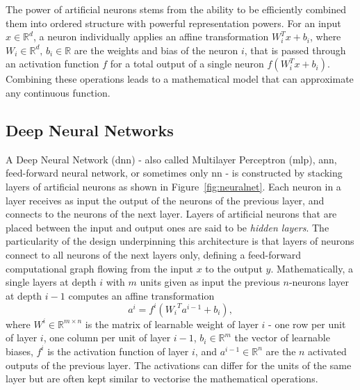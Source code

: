 The power of artificial neurons stems from the ability to be efficiently combined them into ordered structure with powerful representation powers. For an input $x \in \mathbb{R}^d$, a neuron individually applies an affine transformation $W_i^T x + b_i$, where $W_i \in \mathbb{R}^d,\,b_i \in \mathbb{R}$ are the weights and bias of the neuron $i$, that is passed through an activation function $f$ for a total output of a single neuron $f(W_i^T x + b_i)$. Combining these operations leads to a mathematical model that can approximate any continuous function. 

\subsection{Deep Neural Networks}
A Deep Neural Network (\gls{dnn}) - also called Multilayer Perceptron (\gls{mlp}), \gls{ann}, feed-forward neural network, or sometimes only \gls{nn} - is constructed by stacking layers of artificial neurons as shown in Figure~\ref{fig:neuralnet}. Each neuron in a layer receives as input the output of the neurons of the previous layer, and connects to the neurons of the next layer. Layers of artificial neurons that are placed between the input and output ones are said to be \textit{hidden layers}. The particularity of the design underpinning this architecture is that layers of neurons connect to all neurons of the next layers only, defining a feed-forward computational graph flowing from the input $x$ to the output $y$. Mathematically, a single layers at depth $i$ with $m$ units given as input the previous $n$-neurons layer at depth $i-1$ computes an affine transformation
\begin{equation}\label{eq:feedforward}
    a^i = f^i\left({W_i}^T a^{i-1} + b_i\right),
\end{equation}
where $W^i \in \mathbb{R}^{m \times n}$ is the matrix of learnable weight of layer $i$ - one row per unit of layer $i$, one column per unit of layer $i-1$, $b_i \in \mathbb{R}^m$ the vector of learnable biases, $f^i$ is the activation function of layer $i$, and $a^{i-1} \in \mathbb{R}^n$ are the $n$ activated outputs of the previous layer. The activations can differ for the units of the same layer but are often kept similar to vectorise the mathematical operations. 

